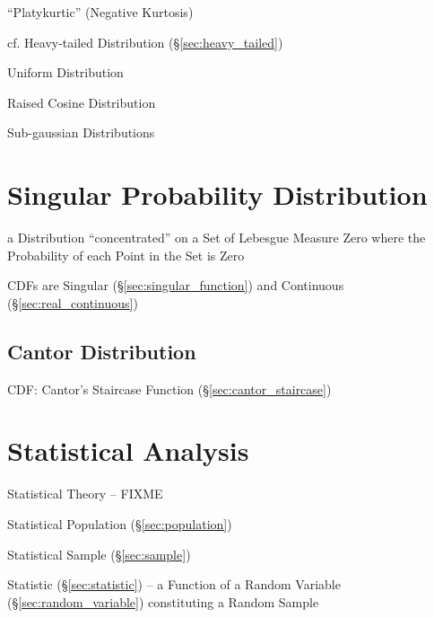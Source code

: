 ``Platykurtic'' (Negative Kurtosis)

cf. Heavy-tailed Distribution (\S\ref{sec:heavy_tailed})

Uniform Distribution

Raised Cosine Distribution

Sub-gaussian Distributions



\section{Singular Probability Distribution}\label{sec:singular_distribution}

a Distribution ``concentrated'' on a Set of Lebesgue Measure Zero where
the Probability of each Point in the Set is Zero

CDFs are Singular (\S\ref{sec:singular_function}) and Continuous
(\S\ref{sec:real_continuous})



\subsection{Cantor Distribution}\label{sec:cantor_distribution}

CDF: Cantor's Staircase Function (\S\ref{sec:cantor_staircase})



\section{Statistical Analysis}\label{sec:statistical_analysis}

Statistical Theory -- FIXME

Statistical Population (\S\ref{sec:population})

Statistical Sample (\S\ref{sec:sample})

Statistic (\S\ref{sec:statistic}) -- a Function of a Random Variable
(\S\ref{sec:random_variable}) constituting a Random Sample

